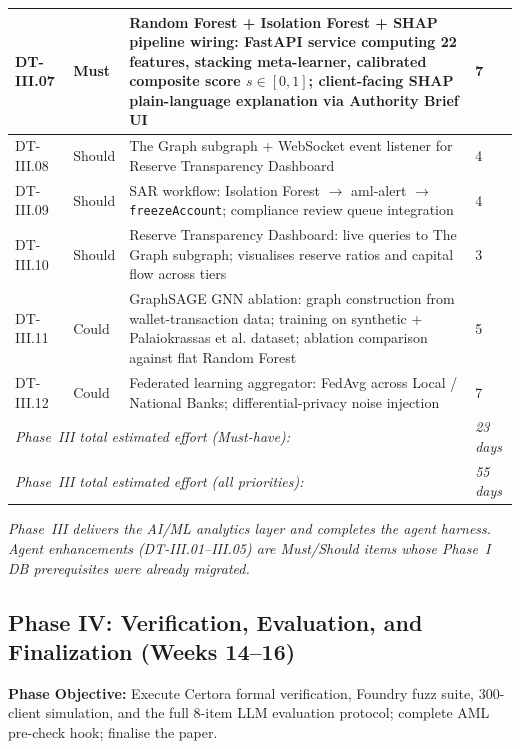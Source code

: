 \documentclass[12pt,a4paper]{report}
\begin{document}
\begin{table}[H]
\begin{tabular}{p{1.8cm}p{1.8cm}p{7.5cm}p{1.5cm}}
\hline
DT-III.07 & Must & Random Forest + Isolation Forest + SHAP pipeline wiring: FastAPI service computing 22 features, stacking meta-learner, calibrated composite score $s \in [0,1]$; client-facing SHAP plain-language explanation via Authority Brief UI & 7 \\
\hline
DT-III.08 & Should & The Graph subgraph + WebSocket event listener for Reserve Transparency Dashboard & 4 \\
\hline
DT-III.09 & Should & SAR workflow: Isolation Forest $\to$ aml-alert $\to$ \texttt{freezeAccount}; compliance review queue integration & 4 \\
\hline
DT-III.10 & Should & Reserve Transparency Dashboard: live queries to The Graph subgraph; visualises reserve ratios and capital flow across tiers & 3 \\
\hline
DT-III.11 & Could & GraphSAGE GNN ablation: graph construction from wallet-transaction data; training on synthetic + Palaiokrassas et al. dataset; ablation comparison against flat Random Forest & 5 \\
\hline
DT-III.12 & Could & Federated learning aggregator: FedAvg across Local / National Banks; differential-privacy noise injection & 7 \\
\hline
\multicolumn{3}{l}{\textit{Phase~III total estimated effort (Must-have):}} & \textit{23 days} \\
\multicolumn{3}{l}{\textit{Phase~III total estimated effort (all priorities):}} & \textit{55 days} \\
\hline
\end{tabular}
\end{table}

\vspace{2pt}
\noindent\textit{\small Phase~III delivers the AI/ML analytics layer and completes the agent harness. Agent enhancements (DT-III.01--III.05) are Must/Should items whose Phase~I DB prerequisites were already migrated.}

\subsection{Phase IV: Verification, Evaluation, and Finalization (Weeks 14--16)}

\textbf{Phase Objective:} Execute Certora formal verification, Foundry fuzz suite,
300-client simulation, and the full 8-item LLM evaluation protocol;
complete AML pre-check hook; finalise the paper.
\end{document}
